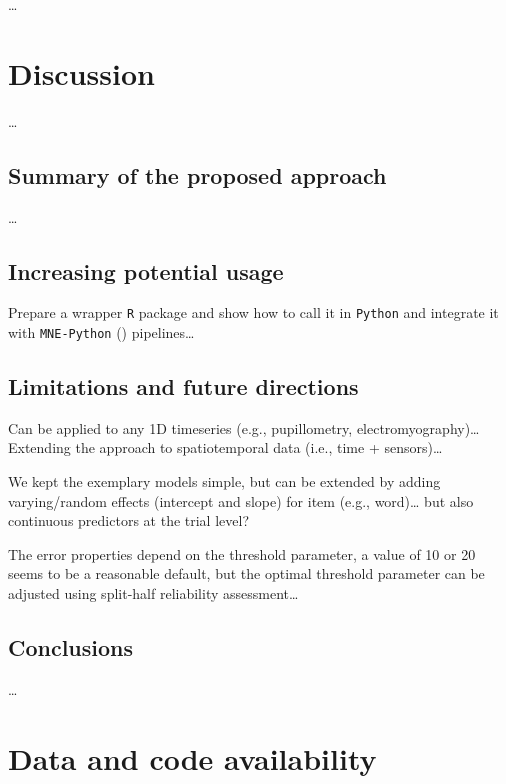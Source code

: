 \documentclass[
  doc,
  floatsintext,
  longtable,
  a4paper,
  nolmodern,
  notxfonts,
  notimes,
  colorlinks=true,linkcolor=blue,citecolor=blue,urlcolor=blue]{apa7}
\begin{document}
\ldots{}

\newpage

\section{Discussion}\label{discussion}

\ldots{}

\subsection{Summary of the proposed
approach}\label{summary-of-the-proposed-approach}

\ldots{}

\subsection{Increasing potential
usage}\label{increasing-potential-usage}

Prepare a wrapper \texttt{R} package and show how to call it in
\texttt{Python} and integrate it with \texttt{MNE-Python}
() pipelines\ldots{}

\subsection{Limitations and future
directions}\label{limitations-and-future-directions}

Can be applied to any 1D timeseries (e.g., pupillometry,
electromyography)\ldots{} Extending the approach to spatiotemporal data
(i.e., time + sensors)\ldots{}

We kept the exemplary models simple, but can be extended by adding
varying/random effects (intercept and slope) for item (e.g.,
word)\ldots{} but also continuous predictors at the trial level?

The error properties depend on the threshold parameter, a value of 10 or
20 seems to be a reasonable default, but the optimal threshold parameter
can be adjusted using split-half reliability assessment\ldots{}

\subsection{Conclusions}\label{conclusions}

\ldots{}

\newpage

\section{Data and code availability}\label{data-and-code-availability}
\end{document}
